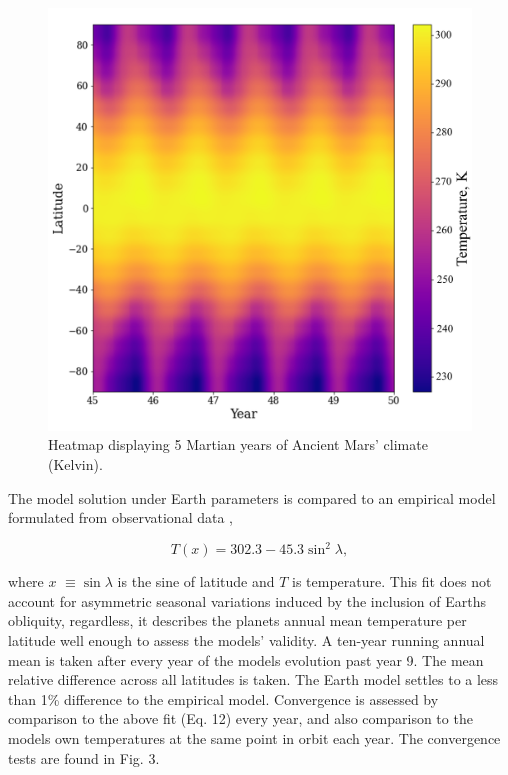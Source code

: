 \documentclass[12pt,onecolumn]{revtex4-2}    %
\begin{document}
\begin{figure}[h]
\centering
\includegraphics[width = 14cm]{Earth5yrsHeatmapNew.png}
\caption{Heatmap displaying 5 Martian years of Ancient Mars' climate (Kelvin).}
\label{fig:test}
\end{figure}

The model solution under Earth parameters is compared to an empirical model formulated from observational data \cite{NC79},

\begin{equation}
T(x) = 302.3 - 45.3 \sin^{2}\lambda,
\end{equation}

where $x$ $\equiv \sin\lambda$ is the sine of latitude and $T$ is temperature. This fit does not account for asymmetric seasonal variations induced by the inclusion of Earths obliquity, regardless, it describes the planets annual mean temperature per latitude well enough to assess the models' validity. A ten-year running annual mean is taken after every year of the models evolution past year 9. The mean relative difference across all latitudes is taken. The Earth model settles to a less than 1\% difference to the empirical model. Convergence is assessed by comparison to the above fit (Eq. 12) every year, and also comparison to the models own temperatures at the same point in orbit each year. The convergence tests are found in Fig. 3.
\end{document}
